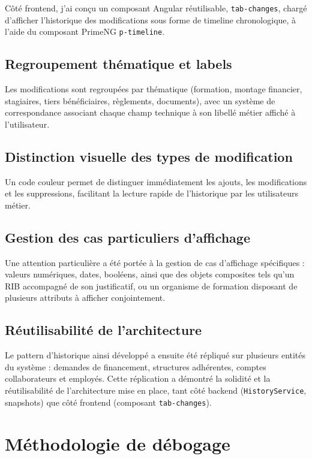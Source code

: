 Côté frontend, j'ai conçu un composant Angular réutilisable,
\texttt{tab-changes}, chargé d'afficher l'historique des modifications
sous forme de timeline chronologique, à l'aide du composant PrimeNG
\texttt{p-timeline}.

\subsection{Regroupement thématique et labels}

Les modifications sont regroupées par thématique (formation, montage
financier, stagiaires, tiers bénéficiaires, règlements, documents), avec
un système de correspondance associant chaque champ technique à son
libellé métier affiché à l'utilisateur.

\subsection{Distinction visuelle des types de modification}

Un code couleur permet de distinguer immédiatement les ajouts, les
modifications et les suppressions, facilitant la lecture rapide de
l'historique par les utilisateurs métier.

\subsection{Gestion des cas particuliers d'affichage}

Une attention particulière a été portée à la gestion de cas d'affichage
spécifiques : valeurs numériques, dates, booléens, ainsi que des objets
composites tels qu'un RIB accompagné de son justificatif, ou un organisme
de formation disposant de plusieurs attributs à afficher conjointement.

\subsection{Réutilisabilité de l'architecture}

Le pattern d'historique ainsi développé a ensuite été répliqué sur
plusieurs entités du système : demandes de financement, structures
adhérentes, comptes collaborateurs et employés. Cette réplication a
démontré la solidité et la réutilisabilité de l'architecture mise en
place, tant côté backend (\texttt{HistoryService}, snapshots) que côté
frontend (composant \texttt{tab-changes}).

\section{Méthodologie de débogage}


